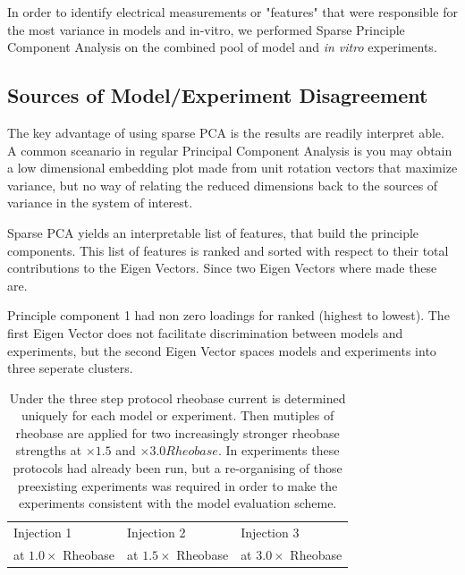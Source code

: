 In order to identify electrical measurements or "features" that were responsible for the most variance in models and in-vitro, we performed Sparse Principle Component Analysis \citep{zou2006sparse} on the combined pool of model and \emph{in vitro} experiments. 

\subsection{Sources of Model/Experiment Disagreement}
The key advantage of using sparse PCA is the results are readily interpret able. 
A common sceanario in regular Principal Component Analysis is you may obtain a low dimensional embedding plot made from unit rotation vectors that maximize variance, but no way of relating the reduced dimensions back to the sources of variance in the system of interest. 

Sparse PCA yields an interpretable list of features, that build the principle components.
This list of features is ranked and sorted with respect to their total contributions to the Eigen Vectors. Since two Eigen Vectors where made these are.

Principle component 1 had non zero loadings for ranked (highest to lowest).
The first Eigen Vector does not facilitate discrimination between models and experiments, but the second Eigen Vector spaces models and experiments into three seperate clusters.

\begin{table}
\begin{tabular}{lll}
\toprule
{} Injection 1 & Injection 2 & Injection 3 \\
 at $1.0 \times$ Rheobase & at $1.5 \times$ Rheobase & at $3.0 \times$ Rheobase 

\end{tabular}
\caption[Model Specific, Three Step Stimulus Protocol]{Under the three step protocol rheobase current is determined uniquely for each model or experiment. Then mutiples of rheobase are applied for two increasingly stronger rheobase strengths at $\times 1.5$ and $\times 3.0 Rheobase$.
In experiments these protocols had already been run, but a re-organising of those preexisting experiments was required in order to make the experiments consistent with the model evaluation scheme.}
\end{table}

